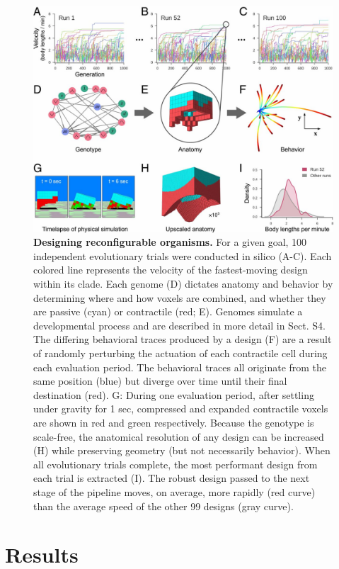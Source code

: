 \begin{figure}[!ht]
\centering
\includegraphics[width=0.9\linewidth]{Chapter07/img/F2.large.jpg}
\caption{\textbf{Designing reconfigurable organisms.} For a given goal, 100 independent evolutionary trials were conducted in silico (A-C). Each colored line represents the velocity of the fastest-moving design within its clade. Each genome (D) dictates anatomy and behavior by determining where and how voxels are combined, and whether they are passive (cyan) or contractile (red; E). Genomes simulate a developmental process and are described in more detail in Sect. S4. The differing behavioral traces produced by a design (F) are a result of randomly perturbing the actuation of each contractile cell during each evaluation period. The behavioral traces all originate from the same position (blue) but diverge over time until their final destination (red). G: During one evaluation period, after settling under gravity for 1 sec, compressed and expanded contractile voxels are shown in red and green respectively. Because the genotype is scale-free, the anatomical resolution of any design can be increased (H) while preserving geometry (but not necessarily behavior). When all evolutionary trials complete, the most performant design from each trial is extracted (I). The robust design passed to the next stage of the pipeline moves, on average, more rapidly (red curve) than the average speed of the other 99 designs (gray curve).}
\end{figure}


\section{Results}

